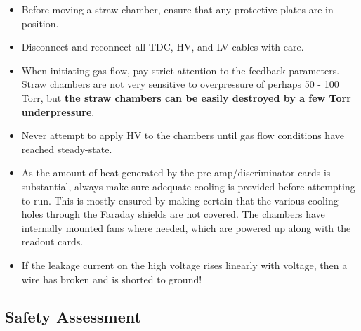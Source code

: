 \begin{itemize}

\item{Before moving a straw chamber, ensure that any protective
plates are in position.}

\item{Disconnect and reconnect all TDC, HV, and LV cables with care.}

\item{When initiating gas flow, pay strict attention to the feedback
parameters.
Straw chambers are not very sensitive to overpressure of perhaps
50 - 100 Torr,
but {\bf the straw chambers can be easily destroyed by a few Torr 
underpressure}. }

\item{Never attempt to apply HV to the chambers until gas flow
conditions have reached steady-state.}

\item{As the amount of heat generated by the pre-amp/discriminator
cards is substantial, always make sure adequate cooling is provided
before attempting to run.
This is mostly ensured by making certain that the various
cooling holes through the Faraday shields are not covered.
The chambers have internally mounted fans where needed, which
are powered up along with the readout cards.}

\item{If the leakage current on the high voltage rises linearly
with voltage, then a wire has broken and
is shorted to ground!}

\end{itemize}

\begin{safetyen}{0}{0}
\subsection{Safety Assessment}
\label{sec:fpp_safety}
\end{safetyen}

